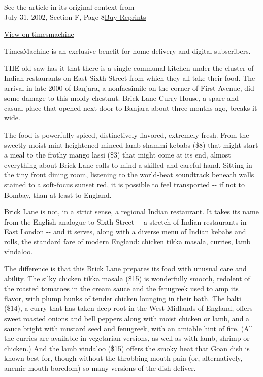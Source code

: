 See the article in its original context from\\
July 31, 2002, Section F, Page
8\href{https://store.nytimes3xbfgragh.onion/collections/new-york-times-page-reprints?utm_source=nytimes\&utm_medium=article-page\&utm_campaign=reprints}{Buy
Reprints}

\href{http://timesmachine.nytimes3xbfgragh.onion/timesmachine/2002/07/31/175382.html}{View
on timesmachine}

TimesMachine is an exclusive benefit for home delivery and digital
subscribers.

THE old saw has it that there is a single communal kitchen under the
cluster of Indian restaurants on East Sixth Street from which they all
take their food. The arrival in late 2000 of Banjara, a nonfacsimile on
the corner of First Avenue, did some damage to this moldy chestnut.
Brick Lane Curry House, a spare and casual place that opened next door
to Banjara about three months ago, breaks it wide.

The food is powerfully spiced, distinctively flavored, extremely fresh.
From the sweetly moist mint-heightened minced lamb shammi kebabs (\$8)
that might start a meal to the frothy mango lassi (\$3) that might come
at its end, almost everything about Brick Lane calls to mind a skilled
and careful hand. Sitting in the tiny front dining room, listening to
the world-beat soundtrack beneath walls stained to a soft-focus sunset
red, it is possible to feel transported -\/- if not to Bombay, than at
least to England.

Brick Lane is not, in a strict sense, a regional Indian restaurant. It
takes its name from the English analogue to Sixth Street -\/- a stretch
of Indian restaurants in East London -\/- and it serves, along with a
diverse menu of Indian kebabs and rolls, the standard fare of modern
England: chicken tikka masala, curries, lamb vindaloo.

The difference is that this Brick Lane prepares its food with unusual
care and ability. The silky chicken tikka masala (\$15) is wonderfully
smooth, redolent of the roasted tomatoes in the cream sauce and the
fenugreek used to amp its flavor, with plump hunks of tender chicken
lounging in their bath. The balti (\$14), a curry that has taken deep
root in the West Midlands of England, offers sweet roasted onions and
bell peppers along with moist chicken or lamb, and a sauce bright with
mustard seed and fenugreek, with an amiable hint of fire. (All the
curries are available in vegetarian versions, as well as with lamb,
shrimp or chicken.) And the lamb vindaloo (\$15) offers the smoky heat
that Goan dish is known best for, though without the throbbing mouth
pain (or, alternatively, anemic mouth boredom) so many versions of the
dish deliver.

